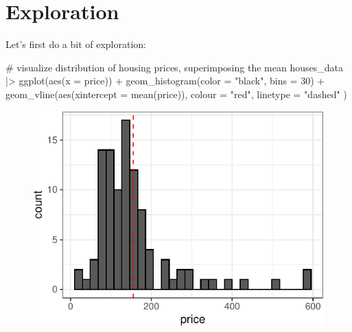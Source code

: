 \documentclass[
  11pt,
  letterpaper,
  oneside]{book}
\newenvironment{Shaded}{\begin{snugshade}}{\end{snugshade}}
\newcommand{\AttributeTok}[1]{\textcolor[rgb]{0.40,0.45,0.13}{#1}}
\newcommand{\CommentTok}[1]{\textcolor[rgb]{0.37,0.37,0.37}{#1}}
\newcommand{\DecValTok}[1]{\textcolor[rgb]{0.68,0.00,0.00}{#1}}
\newcommand{\FunctionTok}[1]{\textcolor[rgb]{0.28,0.35,0.67}{#1}}
\newcommand{\NormalTok}[1]{\textcolor[rgb]{0.00,0.23,0.31}{#1}}
\newcommand{\SpecialCharTok}[1]{\textcolor[rgb]{0.37,0.37,0.37}{#1}}
\newcommand{\StringTok}[1]{\textcolor[rgb]{0.13,0.47,0.30}{#1}}
\theoremstyle{plain}
\theoremstyle{plain}
\theoremstyle{definition}
\theoremstyle{definition}
\theoremstyle{plain}
\theoremstyle{remark}
\begin{document}
\hypertarget{exploration-1}{%
\section{Exploration}\label{exploration-1}}

Let's first do a bit of exploration:

\begin{Shaded}
\begin{Highlighting}[]
\CommentTok{\# visualize distribution of housing prices, superimposing the mean}
\NormalTok{houses\_data }\SpecialCharTok{|\textgreater{}}
  \FunctionTok{ggplot}\NormalTok{(}\FunctionTok{aes}\NormalTok{(}\AttributeTok{x =}\NormalTok{ price)) }\SpecialCharTok{+}
  \FunctionTok{geom\_histogram}\NormalTok{(}\AttributeTok{color =} \StringTok{"black"}\NormalTok{, }\AttributeTok{bins =} \DecValTok{30}\NormalTok{) }\SpecialCharTok{+}
  \FunctionTok{geom\_vline}\NormalTok{(}\FunctionTok{aes}\NormalTok{(}\AttributeTok{xintercept =} \FunctionTok{mean}\NormalTok{(price)),}
    \AttributeTok{colour =} \StringTok{"red"}\NormalTok{,}
    \AttributeTok{linetype =} \StringTok{"dashed"}
\NormalTok{  )}
\end{Highlighting}
\end{Shaded}

\begin{figure}[H]

{\centering \includegraphics{r-demo-part-2_files/figure-pdf/unnamed-chunk-3-1.pdf}

}

\end{figure}
\end{document}
